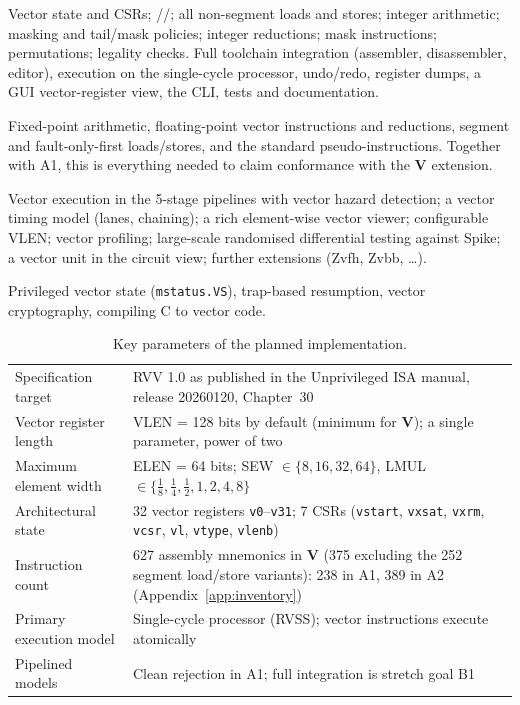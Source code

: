\documentclass[11pt]{article}
\begin{document}
\begin{keybox}[title=Scope at a glance]
\begin{description}[leftmargin=0pt,labelsep=0.4em,itemsep=0.35em]
\item[\tierA{Compulsory --- A1 Core.}] Vector state and CSRs; //;
  all non-segment loads and stores; integer arithmetic; masking and tail/mask policies; integer
  reductions; mask instructions; permutations; legality checks. Full toolchain integration
  (assembler, disassembler, editor), execution on the single-cycle processor, undo/redo, register
  dumps, a GUI vector-register view, the CLI, tests and documentation.
\item[\tierAA{Compulsory --- A2 Spec completion.}] Fixed-point arithmetic, floating-point vector
  instructions and reductions, segment and fault-only-first loads/stores, and the standard
  pseudo-instructions. Together with A1, this is everything needed to claim conformance with the
  \textbf{V} extension.
\item[\tierB{Over and above --- B.}] Vector execution in the 5-stage pipelines with vector hazard
  detection; a vector timing model (lanes, chaining); a rich element-wise vector viewer;
  configurable VLEN; vector profiling; large-scale randomised differential testing against Spike;
  a vector unit in the circuit view; further extensions (Zvfh, Zvbb, \dots).
\item[\textsf{\textbf{\color{kgrey}Out of scope --- C.}}] Privileged vector state (\texttt{mstatus.VS}),
  trap-based resumption, vector cryptography, compiling C to vector code.
\end{description}
\end{keybox}

\begin{table}[htbp]
\centering\small
\caption{Key parameters of the planned implementation.}\label{tab:params}
\begin{tabularx}{\textwidth}{@{}L{4.6cm}Y@{}}
\toprule
Specification target & RVV 1.0 as published in the Unprivileged ISA manual, release 20260120, Chapter~30~\cite{spec} \\
Vector register length & VLEN = 128 bits by default (minimum for \textbf{V}); a single parameter, power of two \\
Maximum element width & ELEN = 64 bits; SEW $\in\{8,16,32,64\}$, LMUL $\in\{\tfrac18,\tfrac14,\tfrac12,1,2,4,8\}$ \\
Architectural state & 32 vector registers \texttt{v0}--\texttt{v31}; 7 CSRs (\texttt{vstart}, \texttt{vxsat}, \texttt{vxrm}, \texttt{vcsr}, \texttt{vl}, \texttt{vtype}, \texttt{vlenb}) \\
Instruction count & 627 assembly mnemonics in \textbf{V} (375 excluding the 252 segment load/store variants): 238 in A1, 389 in A2 (Appendix~\ref{app:inventory}) \\
Primary execution model & Single-cycle processor (RVSS); vector instructions execute atomically \\
Pipelined models & Clean rejection in A1; full integration is stretch goal B1 \\
\bottomrule
\end{tabularx}
\end{table}
\end{document}
